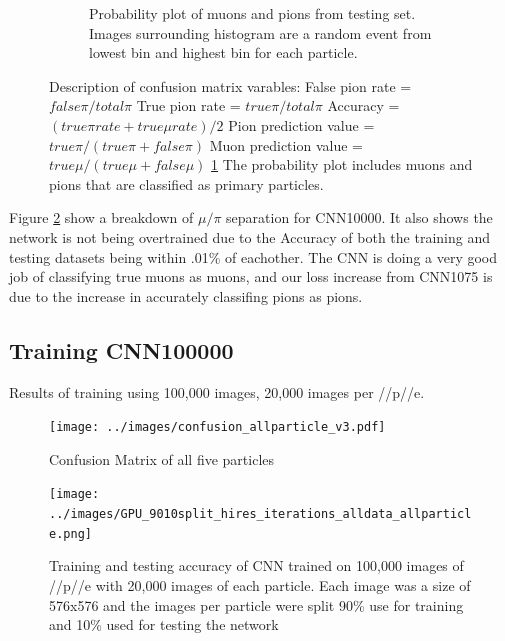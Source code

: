 \begin{figure}[htp!]
\begin{subfigure}[b]{\textwidth}
	\caption{Probability plot of muons and pions from testing set. Images surrounding histogram are a random event from lowest bin and highest bin for each particle.}
	\label{fig:prob_plot}
	\end{subfigure}
\caption{Description of confusion matrix varables: False pion rate = $false \pi/ total \pi$ True pion rate = $true \pi/total \pi$ Accuracy = $(true \pi rate + true \mu rate)/2$ Pion prediction value = $true \pi/(true \pi + false \pi)$ Muon prediction value = $true \mu/(true \mu + false \mu)$ \ref{fig:prob_plot} The probability plot includes muons and pions that are classified as primary particles.}
\label{fig:CNN_train}
\end{figure}

Figure \ref{fig:CNN_train} show a breakdown of $\mu/\pi$ separation for CNN10000. It also shows the network is not being overtrained due to the Accuracy of both the training and testing datasets being within .01\% of eachother. The CNN is doing a very good job of classifying true muons as muons, and our loss increase from CNN1075 is due to the increase in accurately classifing pions as pions. 



\subsection{Training CNN100000}
Results of training using 100,000 images, 20,000 images per \mu/\pi/p/\gamma/e. 


\begin{figure}[htp]
\centering
\texttt{[image: ../images/confusion\_allparticle\_v3.pdf]}
\caption{Confusion Matrix of all five particles }
\label{fig:confusion100000}
\end{figure}

\begin{figure}[htp]
\centering
\texttt{[image: ../images/GPU\_9010split\_hires\_iterations\_alldata\_allparticle.png]}
\caption{Training and testing accuracy of CNN trained on 100,000 images of \mu/\pi/p/\gamma/e with 20,000 images of each particle. Each image was a size of 576x576 and the images per particle were split 90\% use for training and 10\% used for testing the network}
\label{fig:gpuacc}
\end{figure}

